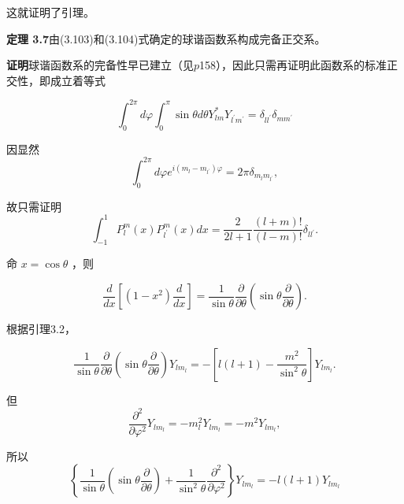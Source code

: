 这就证明了引理。

\textbf{定理 3.7}\quad 由(3.103)和(3.104)式确定的球谐函数系构成完备正交系。

\textbf{证明}\quad 球谐函数系的完备性早已建立（见$p$158），因此只需再证明此函数系的标准正交性，即成立着等式

\begin{equation*}
\int_ {0} ^ {2 \pi} d \varphi \int_ {0} ^ {\pi} \sin \theta d \theta Y _ {l m} ^ {*} Y _ {l ^ {\prime} m ^ {\prime}} = \delta_ {l l ^ {\prime}} \delta_ {m m ^ {\prime}}\tag{3.112}
\end{equation*}

因显然
\begin{equation*}
\int_ {0} ^ {2 \pi} d \varphi e ^ {i (m _ {l} - m _ {l ^ {\prime}}) \varphi} = 2 \pi \delta_ {m _ {l} m _ {l ^ {\prime}}},
\end{equation*}

故只需证明
\begin{equation*}
\int_ {- 1} ^ {1} P _ {l} ^ {m} (x) P _ {l ^ {\prime}} ^ {m} (x) d x = \frac {2}{2 l + 1} \frac {(l + m) !}{(l - m) !} \delta_ {l l ^ {\prime}}.
\end{equation*}

命 $x = \cos \theta$ ，则

\begin{equation*}
\frac {d}{d x} \left[ (1 - x ^ {2}) \frac {d}{d x} \right] = \frac {1}{\sin \theta} \frac {\partial}{\partial \theta} \left(\sin \theta \frac {\partial}{\partial \theta}\right).
\end{equation*}

根据引理3.2，

\begin{equation*}
\frac {1}{\sin \theta} \frac {\partial}{\partial \theta} \left(\sin \theta \frac {\partial}{\partial \theta}\right) Y _ {l m _ {l}} = - \left[ l (l + 1) - \frac {m ^ {2}}{\sin^ {2} \theta} \right] Y _ {l m _ {l}}.
\end{equation*}

但
\begin{equation*}
\frac {\partial^ {2}}{\partial \varphi^ {2}} Y _ {l m _ {l}} = - m _ {l} ^ {2} Y _ {l m _ {l}} = - m ^ {2} Y _ {l m _ {l}},
\end{equation*}

所以
\begin{equation*}
\left\{\frac {1}{\sin \theta} \left(\sin \theta \frac {\partial}{\partial \theta}\right) + \frac {1}{\sin^ {2} \theta} \frac {\partial^ {2}}{\partial \varphi^ {2}} \right\} Y _ {l m _ {l}} = - l (l + 1) Y _ {l m _ {l}}\tag{3.113}
\end{equation*}

